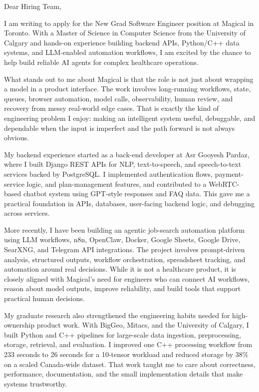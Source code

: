 \documentclass[11pt]{letter}
\begin{document}
\begin{letter}{}

\opening{Dear Hiring Team,}

I am writing to apply for the New Grad Software Engineer position at Magical in Toronto. With a Master of Science in Computer Science from the University of Calgary and hands-on experience building backend APIs, Python/C++ data systems, and LLM-enabled automation workflows, I am excited by the chance to help build reliable AI agents for complex healthcare operations.

What stands out to me about Magical is that the role is not just about wrapping a model in a product interface. The work involves long-running workflows, state, queues, browser automation, model calls, observability, human review, and recovery from messy real-world edge cases. That is exactly the kind of engineering problem I enjoy: making an intelligent system useful, debuggable, and dependable when the input is imperfect and the path forward is not always obvious.

My backend experience started as a back-end developer at Asr Gooyesh Pardaz, where I built Django REST APIs for NLP, text-to-speech, and speech-to-text services backed by PostgreSQL. I implemented authentication flows, payment-service logic, and plan-management features, and contributed to a WebRTC-based chatbot system using GPT-style responses and FAQ data. This gave me a practical foundation in APIs, databases, user-facing backend logic, and debugging across services.

More recently, I have been building an agentic job-search automation platform using LLM workflows, n8n, OpenClaw, Docker, Google Sheets, Google Drive, SearXNG, and Telegram API integrations. The project involves prompt-driven analysis, structured outputs, workflow orchestration, spreadsheet tracking, and automation around real decisions. While it is not a healthcare product, it is closely aligned with Magical's need for engineers who can connect AI workflows, reason about model outputs, improve reliability, and build tools that support practical human decisions.

My graduate research also strengthened the engineering habits needed for high-ownership product work. With BigGeo, Mitacs, and the University of Calgary, I built Python and C++ pipelines for large-scale data ingestion, preprocessing, storage, retrieval, and evaluation. I improved one C++ processing workflow from 233 seconds to 26 seconds for a 10-tensor workload and reduced storage by 38\% on a scaled Canada-wide dataset. That work taught me to care about correctness, performance, documentation, and the small implementation details that make systems trustworthy.


\end{letter}
\end{document}
